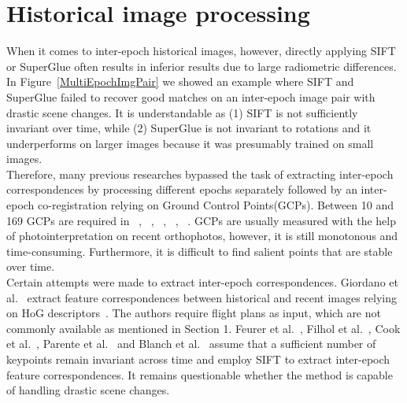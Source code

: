 \section{Historical image processing}
When it comes to inter-epoch historical images, however, directly applying SIFT or SuperGlue often results in inferior results due to large radiometric differences.
In Figure~\ref{MultiEpochImgPair} we showed an example where SIFT and SuperGlue failed to recover good matches on an inter-epoch image pair with drastic scene changes. It is understandable as (1) SIFT is not sufficiently invariant over time, while (2) SuperGlue is not invariant to rotations and it underperforms on larger images because it was presumably trained on small images.\\
Therefore, many previous researches bypassed the task of extracting inter-epoch correspondences by processing different epochs separately followed by an inter-epoch co-registration relying on Ground Control Points(GCPs).
Between 10 and 169 GCPs are required in ~\cite{pinto2019archived}, ~\cite{bozek2019analysis}, ~\cite{persia2020archival}, ~\cite{micheletti2015application}, ~\cite{molg2017structure}.
GCPs are usually measured with the help of photointerpretation on recent orthophotos, however, it is still monotonous and time-consuming. Furthermore, it is difficult to find salient points that are stable over time.\\
Certain attempts were made to extract inter-epoch correspondences. Giordano et al.~\cite{giordano2018toward} extract feature correspondences between historical and recent images relying on HoG descriptors~\cite{dalal2005histograms}. The authors require flight plans as input, which are not commonly available as mentioned in Section 1. Feurer et al.~\cite{feurer2018joining}, Filhol et al.~\cite{filhol2019time}, Cook et al.~\cite{cook2019simple}, Parente et al.~\cite{parente2021automated} and Blanch et al.~\cite{blanch2021multi} assume that a sufficient number of keypoints remain invariant across time and employ SIFT to extract inter-epoch feature correspondences. It remains questionable whether the method is capable of handling drastic scene changes.
